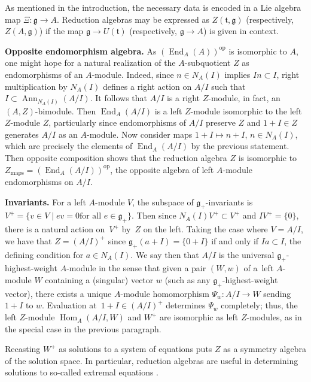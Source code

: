\documentclass[10pt,a4paper]{amsart}
\numberwithin{equation}{section}
\DeclareMathOperator{\Ann}{Ann}
\DeclareMathOperator{\End}{End}
\DeclareMathOperator{\Hom}{Hom}
\begin{document}
\begin{Remark}
	As mentioned in the introduction, the necessary data is encoded in a Lie algebra map $\Xi\colon \mathfrak{g} \rightarrow A$. Reduction algebras may be expressed as $Z(\mathfrak{t},\mathfrak{g})$ (respectively, $Z(A, \mathfrak{g})$) if the map $\mathfrak{g} \rightarrow U(\mathfrak{t})$ (respectively, $\mathfrak{g} \rightarrow A$) is given in context.
\end{Remark}

{\bf Opposite endomorphism algebra.} As $(\End_{A}(A))^{\mathrm{op}}$ is isomorphic to $A$, one might hope for a natural realization of the $A$-sub\-quo\-tient $Z$ as endomorphisms of an $A$-module.
Indeed, since $n \in N_{A}(I)$ implies $In \subset I$, right multiplication by $N_{A}(I)$ defines a right action on $A/I$ such that $I \subset \Ann_{N_{A}(I)}(A/I)$. It follows that $A/I$ is a right $Z$-module, in fact, an $(A,Z)$-bimodule. Then $\End_{A}(A/I)$ is a left $Z$-module isomorphic to the left $Z$-module $Z$, particularly since endomorphisms of $A/I$ preserve $Z$ and $1+I \in Z$ generates $A/I$ as an $A$-module. Now consider maps $1+I \mapsto n+I$, $n \in N_{A}(I)$, which are precisely the elements of $\End_{A}(A/I)$ by the previous statement. Then opposite composition shows that the reduction algebra $Z$ is isomorphic to $Z_{\text{maps}} = (\End_{A}(A/I))^{\mathrm{op}}$, the opposite algebra of left $A$-module endomorphisms on $A/I$.

{\bf Invariants.}
For a left $A$-module $V$, the subspace of $\mathfrak{g}_{+}$-invariants is $V^{+} = \{{v \in V \mid ev = 0} \allowbreak \text{for all } e\in \mathfrak{g}_{+} \}$.
Then since $N_{A}(I)V^{+} \subset V^{+}$ and $IV^{+} = \{0\}$, there is a natural action on~$V^{+}$ by~$Z$ on the left. Taking the case where $V = A/I$, we have that $Z = (A/I)^{+}$ since ${\mathfrak{g}_{+}(a + I) = \{0 + I\}}$ if and only if $Ia \subset I$, the defining condition for $a \in N_{A}(I)$. We say then that $A/I$ is the universal $\mathfrak{g}_{+}$-highest-weight $A$-module in the sense that given a pair $(W,w)$ of a~left $A$-module $W$ containing a (singular) vector $w$ (such as any $\mathfrak{g}_{+}$-highest-weight vector), there exists a unique $A$-module homomorphism $\Psi_{w}\colon A/I \rightarrow W$ sending $1+I$ to $w$. Evaluation at~${1+I \in (A/I)^{+}}$ determines $\Psi_{w}$ completely; thus, the left $Z$-module $\Hom_{A}(A/I,W)$ and $W^{+}$ are isomorphic
as left $Z$-modules, as in the special case in the previous paragraph.

\begin{Remark}
	Recasting $W^{+}$ as solutions to a system of equations puts $Z$ as a symmetry algebra of the solution space. In particular, reduction algebras are useful in determining solutions to so-called extremal equations \cite{zhelobenkoHypersymmetriesExtremalEquations1997}.
\end{Remark}
\end{document}
